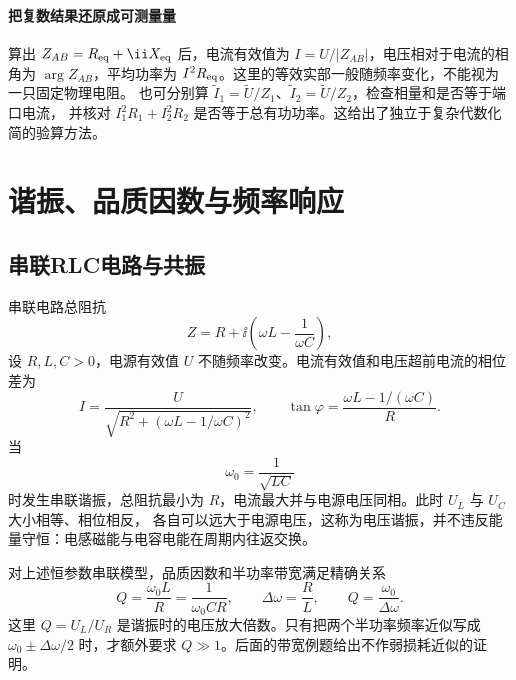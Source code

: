 
\paragraph{把复数结果还原成可测量量}
算出 $Z_{AB}=R_{\rm eq}+\ii X_{\rm eq}$ 后，电流有效值为 $I=U/|Z_{AB}|$，电压相对于电流的相角为
$\arg Z_{AB}$，平均功率为 $I^2R_{\rm eq}$。这里的等效实部一般随频率变化，不能视为一只固定物理电阻。
也可分别算 $\widetilde I_1=\widetilde U/Z_1$、$\widetilde I_2=\widetilde U/Z_2$，检查相量和是否等于端口电流，
并核对 $I_1^2R_1+I_2^2R_2$ 是否等于总有功功率。这给出了独立于复杂代数化简的验算方法。




\section{谐振、品质因数与频率响应}

\subsection{串联RLC电路与共振}


串联电路总阻抗
\begin{equation}
 Z=R+\ii\left(\omega L-\frac1{\omega C}\right),
\end{equation}
设 $R,L,C>0$，电源有效值 $U$ 不随频率改变。电流有效值和电压超前电流的相位差为
\begin{equation}
 I=\frac{U}{\sqrt{R^2+(\omega L-1/\omega C)^2}},
 \qquad
 \tan\varphi=\frac{\omega L-1/(\omega C)}R.
\end{equation}
当
\begin{equation}
 \omega_0=\frac1{\sqrt{LC}}
\end{equation}
时发生串联谐振，总阻抗最小为 $R$，电流最大并与电源电压同相。此时 $U_L$ 与 $U_C$ 大小相等、相位相反，
各自可以远大于电源电压，这称为电压谐振，并不违反能量守恒：电感磁能与电容电能在周期内往返交换。

对上述恒参数串联模型，品质因数和半功率带宽满足精确关系
\begin{equation}
 Q=\frac{\omega_0L}{R}=\frac1{\omega_0CR},
\qquad \Delta\omega=\frac{R}{L},\qquad Q=\frac{\omega_0}{\Delta\omega}.
\end{equation}
这里 $Q=U_L/U_R$ 是谐振时的电压放大倍数。只有把两个半功率频率近似写成
$\omega_0\pm\Delta\omega/2$ 时，才额外要求 $Q\gg1$。后面的带宽例题给出不作弱损耗近似的证明。


